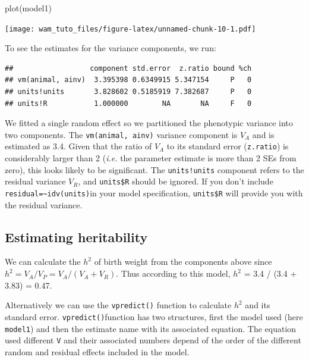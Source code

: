 \documentclass[
  12pt,
]{book}
\newenvironment{Shaded}{\begin{snugshade}}{\end{snugshade}}
\newcommand{\FunctionTok}[1]{\textcolor[rgb]{0.00,0.00,0.00}{#1}}
\newcommand{\NormalTok}[1]{#1}
\newcommand{\SpecialCharTok}[1]{\textcolor[rgb]{0.00,0.00,0.00}{#1}}
\begin{document}
\begin{Shaded}
\begin{Highlighting}[]
\FunctionTok{plot}\NormalTok{(model1)}
\end{Highlighting}
\end{Shaded}

\texttt{[image: wam\_tuto\_files/figure-latex/unnamed-chunk-10-1.pdf]}

To see the estimates for the variance components, we run:

\begin{Shaded}
\end{Shaded}

\begin{verbatim}
##                  component std.error  z.ratio bound %ch
## vm(animal, ainv)  3.395398 0.6349915 5.347154     P   0
## units!units       3.828602 0.5185919 7.382687     P   0
## units!R           1.000000        NA       NA     F   0
\end{verbatim}

We fitted a single random effect so we partitioned the phenotypic variance into two components. The \texttt{vm(animal,\ ainv)} variance component is \(V_A\) and is estimated as 3.4. Given that the ratio of \(V_A\) to its standard error (\texttt{z.ratio}) is considerably larger than 2 (\emph{i.e.} the parameter estimate is more than 2 SEs from zero), this looks likely to be significant. The \texttt{units!units} component refers to the residual variance \(V_R\), and \texttt{units\$R} should be ignored. If you don't include \texttt{residual=\textasciitilde{}idv(units)}in your model specification, \texttt{units\$R} will provide you with the residual variance.

\hypertarget{estimating-heritability}{%
\subsection{Estimating heritability}\label{estimating-heritability}}

We can calculate the \(h^2\) of birth weight from the components above since \(h^2 = V_A/V_P = V_A/(V_A+V_R)\). Thus according to this model, \(h^2\) = 3.4 / (3.4 + 3.83) = 0.47.

Alternatively we can use the \texttt{vpredict()} function to calculate \(h^2\) and its standard error. \texttt{vpredict()}function has two structures, first the model used (here \texttt{model1}) and then the estimate name with its associated equation. The equation used different \texttt{V} and their associated numbers depend of the order of the different random and residual effects included in the model.
\end{document}

